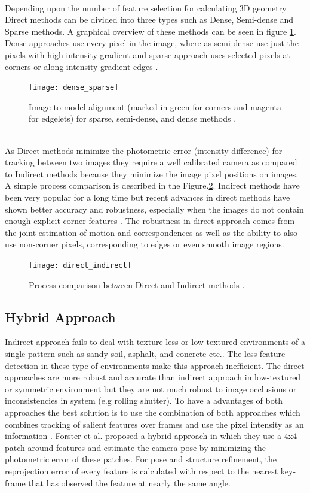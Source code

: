 \\ 
Depending upon the number of feature selection for calculating 3D geometry Direct methods can be divided into three types such as Dense, Semi-dense and Sparse methods. A graphical overview of these methods can be seen in figure \ref{fig:dense_sparse}. Dense approaches use every pixel in the image, where as semi-dense use just the pixels with high intensity gradient and sparse approach uses selected pixels at corners or along intensity gradient edges \cite{engel14eccv}.
\newline
\begin{figure}[h]
	\centering
	\texttt{[image: dense\_sparse]}
	\caption{Image-to-model alignment (marked in green for corners and magenta for
		edgelets) for sparse, semi-dense, and dense methods \cite{7782863}.}
	\label{fig:dense_sparse}
\end{figure}
\\
As Direct methods minimize the photometric error (intensity difference) for tracking between two images they require a well calibrated camera as compared to Indirect methods because they minimize the image pixel positions on images. A simple process comparison is described in the Figure.\ref{fig:direct_indirect}. Indirect methods have been very popular for a long time but recent advances in direct methods have shown better accuracy and robustness, especially when the images do not contain enough explicit corner features \cite{Engel-et-al-pami2018}. The robustness in direct approach comes from the joint estimation of motion and correspondences as well as the ability to also use non-corner pixels, corresponding to edges or even smooth image regions\cite{gao2018ldso}.
\begin{figure}[h]
	\centering
	\texttt{[image: direct\_indirect]}
	\caption{Process comparison between Direct and Indirect methods \cite{engel14eccv}.}
	\label{fig:direct_indirect}
\end{figure}
\subsection{Hybrid Approach}
Indirect approach fails to deal with texture-less or low-textured environments of a single pattern such as sandy soil, asphalt, and concrete etc.. The less feature detection in these type of environments make this approach inefficient. The direct approaches are more robust and accurate than indirect approach in low-textured or symmetric environment but they are not much robust to image occlusions or inconsistencies in system (e.g rolling shutter). To have a advantages of both approaches the best solution is to use the combination of both approaches which combines tracking of salient features over frames and use the pixel intensity as an information \cite{Aqel-et-al-2016}. Forster et al.\cite{7782863} proposed a hybrid approach in which they use a 4x4 patch around features and estimate the camera pose by minimizing the photometric error of these patches. For pose and structure refinement, the reprojection error of every feature is calculated with respect to the nearest key-frame that has observed the feature at nearly the same angle.

